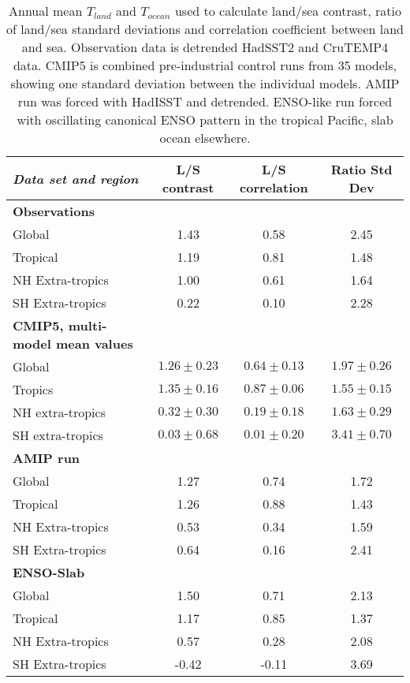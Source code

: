 \begin{center}
	\begin{table}[ht]
		\caption{Annual mean $T_{land}$ and $T_{ocean}$ used to calculate land/sea 
			contrast, ratio of land/sea standard deviations and correlation 
			coefficient between land and sea. Observation data is detrended 
			HadSST2 and CruTEMP4 data. CMIP5 is combined pre-industrial control 
			runs from 35 models, showing one standard deviation between the 
		individual models.  AMIP run was forced with HadISST and detrended.  
	ENSO-like run forced with oscillating canonical ENSO pattern in the tropical 
Pacific, slab ocean elsewhere.}
		\label{tab:allstats}
		\scriptsize
	\begin{tabular}{ l  c  c  c }
		\textit{Data set and region}		& L/S contrast  & L/S correlation & Ratio 
		Std Dev\\ \hline
		\textbf{Observations}\\%
	Global  					& 1.43  & 0.58 & 2.45\\ %
	Tropical  				& 1.19  & 0.81 & 1.48\\ %
	NH Extra-tropics  & 1.00  & 0.61 & 1.64\\ %
	SH Extra-tropics  & 0.22  & 0.10 & 2.28\\ \hline
		\textbf{CMIP5, multi-model mean values}\\%
		Global				& $1.26 \pm 0.23$ & $0.64 \pm 0.13$ & $1.97 \pm 0.26$ \\
		Tropics 			& $1.35 \pm 0.16$ & $0.87 \pm 0.06$ & $1.55 \pm 0.15$ \\ NH 
		extra-tropics & $0.32 \pm 0.30$ & $0.19 \pm 0.18$ & $1.63 \pm 0.29$ \\ SH 
		extra-tropics & $0.03 \pm 0.68$ & $0.01 \pm 0.20$ & $3.41 \pm 0.70$ \\\hline 
		\textbf{AMIP run}\\%
	Global  					& 1.27 & 0.74 & 1.72\\ %
	Tropical  				& 1.26 & 0.88 & 1.43\\ %
	NH Extra-tropics  & 0.53 & 0.34 & 1.59\\ %
	SH Extra-tropics  & 0.64 & 0.16 & 2.41   %
		\\\hline \textbf{ENSO-Slab}\\%
	Global  					& 1.50 & 0.71 & 2.13 \\ %
	Tropical  				& 1.17 & 0.85 & 1.37 \\ %
	NH Extra-tropics  & 0.57 & 0.28 & 2.08 \\ %
	SH Extra-tropics  &-0.42 &-0.11 & 3.69 \\ \hline
	\end{tabular}
	\end{table}
\end{center}

